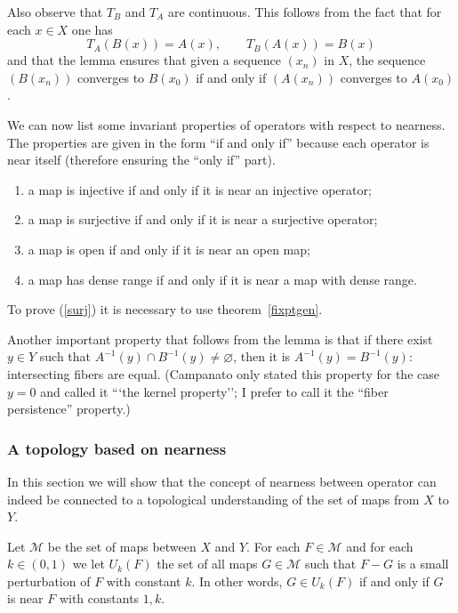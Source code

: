 \documentclass[12pt]{article}
\theoremstyle{normale}
\theoremstyle{liscio}
\begin{document}
Also observe that $T_B$ and $T_A$ are continuous. This follows
from the fact that for each $x \in X$ one has
\[
T_A(B(x)) = A(x), \qquad T_B(A(x)) = B(x)
\]
and that the lemma ensures that given a sequence $(x_n)$ in $X$,
the sequence $(B(x_n))$ converges to $B(x_0)$ if and only if
$(A(x_n))$ converges to $A(x_0)$.

We can now list some invariant properties of operators with
respect to nearness. The properties are given in the form ``if
and only if'' because each operator is near itself (therefore
ensuring the ``only if'' part).

\begin{enumerate}
\item\label{inj} a map is injective if and only if it is near an
injective operator;
\item\label{surj} a map is surjective if and only if it is near a surjective
operator;
\item\label{open} a map is open if and only if it is near an open map;
\item\label{dense} a map has dense range if and only if it is near a map with
dense range.
\end{enumerate}

To prove (\ref{surj}) it is necessary to use
theorem~\ref{fixptgen}.

Another important property that follows from the lemma is that if
there exist $y \in Y$ such that $A^{-1}(y) \cap B^{-1}(y) \ne
\varnothing$, then it is $A^{-1}(y) = B^{-1}(y)$: intersecting
fibers are equal. (Campanato only stated this property for the
case $y = 0$ and called it ```the kernel property''; I prefer to
call it the ``fiber persistence'' property.)

\subsubsection{A topology based on nearness}

In this section we will show that the concept of nearness between
operator can indeed be connected to a topological understanding of
the set of maps from $X$ to $Y$.

\def\M{\mathcal{M}}%
\def\U{\mathcal{U}}%
\def\H{\mathcal{H}}%

Let $\M$ be the set of maps between $X$ and $Y$. For each
$F \in \M$ and for each $k \in (0,1)$ we let $U_k(F)$ the set of
all maps $G \in \M$ such that $F-G$ is a small perturbation of $F$
with constant $k$. In other words, $G \in U_k(F)$ if and only if $G$ is near
$F$ with constants $1, k$.
\end{document}
